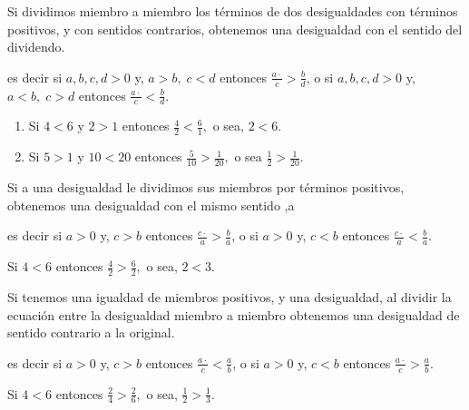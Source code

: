 \documentclass[oneside,english,spanish,2m,twoside,svgnames,x11names,HTML,twoside,12pt]{libro-matua}\usepackage[]{graphicx}\usepackage[]{color}
\begin{document}
\begin{propiedad}{}

Si dividimos miembro a miembro los términos de dos desigualdades con
términos positivos, y con sentidos contrarios, obtenemos una desigualdad
con el sentido del dividendo.

\end{propiedad}

es decir si $a,b,c,d>0$ y, $a>b,\;c<d$ entonces $\frac{a\cdot}{c}>\frac{b}{d}$,
o si $a,b,c,d>0$ y, $a<b,\;c>d$ entonces $\frac{a\cdot}{c}<\frac{b}{d}$.

\begin{ejemplos}
\begin{enumerate}
\item Si $4<6$ y $2>1$ entonces $\frac{4}{2}<\frac{6}{1},$ o sea, $2<6.$
\item Si $5>1$ y $10<20$ entonces $\frac{5}{10}>\frac{1}{20},$ o sea
$\frac{1}{2}>\frac{1}{20}$.
\end{enumerate}
\end{ejemplos}

\begin{propiedad}{}

Si a una desigualdad le dividimos sus miembros por términos positivos,
obtenemos una desigualdad con el mismo sentido ,a

\end{propiedad}

es decir si $a>0$ y, $c>b$ entonces $\frac{c\cdot}{a}>\frac{b}{a}$,
o si $a>0$ y, $c<b$ entonces $\frac{c\cdot}{a}<\frac{b}{a}$.

\begin{ejemplo}

Si $4<6$ entonces $\frac{4}{2}>\frac{6}{2},$ o sea, $2<3.$

\end{ejemplo}

\begin{propiedad}{}

Si tenemos una igualdad de miembros positivos, y una desigualdad,
al dividir la ecuación entre la desigualdad miembro a miembro obtenemos
una desigualdad de sentido contrario a la original.

\end{propiedad}

es decir si $a>0$ y, $c>b$ entonces $\frac{a\cdot}{c}<\frac{a}{b}$,
o si $a>0$ y, $c<b$ entonces $\frac{a\cdot}{c}>\frac{a}{b}$.

\begin{ejemplo}

Si $4<6$ entonces $\frac{2}{4}>\frac{2}{6},$ o sea, $\frac{1}{2}>\frac{1}{3}.$

\end{ejemplo}
\end{document}
